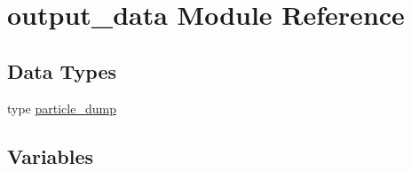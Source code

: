 \hypertarget{namespaceoutput__data}{}\section{output\+\_\+data Module Reference}
\label{namespaceoutput__data}
\subsection*{Data Types}
\begin{DoxyCompactItemize}
\item 
type \hyperlink{structoutput__data_1_1particle__dump}{particle\+\_\+dump}
\end{DoxyCompactItemize}
\subsection*{Variables}
